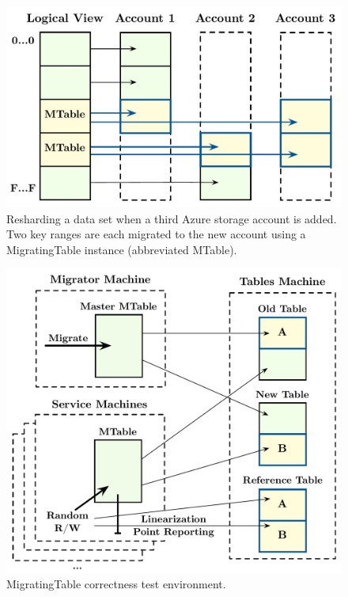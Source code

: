 \begin{figure}[t]
\centering
\includegraphics[width=\linewidth]{img/livemigration}
\caption{Resharding a data set when a third Azure storage account is added. Two key ranges are each migrated to the new account using a MigratingTable instance (abbreviated MTable).}
\label{fig:livemigration}
\end{figure}

\begin{figure}[t]
\centering
\includegraphics[width=\linewidth]{img/mocked_migration}
\caption{MigratingTable \psharp correctness test environment.}
\label{fig:mockedmigration}
\end{figure}

